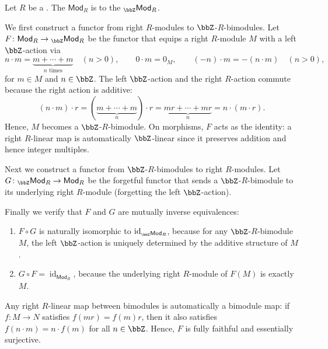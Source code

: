 \begin{proposition} \label{proposition:category_of_right_R_modules_is_equivalent_to_Z_R_bimodules}
    Let $R$ be a . The  $\mathsf{Mod}_R$ is  to the  ${}_\bbZ\mathsf{Mod}_R$.

    We first construct a functor from right $R$-modules to $\bbZ$-$R$-bimodules. Let $F \colon \mathsf{Mod}_R \to {}_\bbZ\mathsf{Mod}_R$ be the functor that equips a right $R$-module $M$ with a left $\bbZ$-action via
    $$n \cdot m = \underbrace{m + \cdots + m}_{n \text{ times}} \quad (n > 0), \qquad 0 \cdot m = 0_M, \qquad (-n) \cdot m = -(n \cdot m) \quad (n > 0),$$
    for $m \in M$ and $n \in \bbZ$. The left $\bbZ$-action and the right $R$-action commute because the right action is additive:
    $$(n \cdot m) \cdot r = (\underbrace{m + \cdots + m}_{n}) \cdot r = \underbrace{mr + \cdots + mr}_{n} = n \cdot (m \cdot r).$$
    Hence, $M$ becomes a $\bbZ$-$R$-bimodule. On morphisms, $F$ acts as the identity: a right $R$-linear map is automatically $\bbZ$-linear since it preserves addition and hence integer multiples.

    Next we construct a functor from $\bbZ$-$R$-bimodules to right $R$-modules. Let $G \colon {}_\bbZ\mathsf{Mod}_R \to \mathsf{Mod}_R$ be the forgetful functor that sends a $\bbZ$-$R$-bimodule to its underlying right $R$-module (forgetting the left $\bbZ$-action).

    Finally we verify that $F$ and $G$ are mutually inverse equivalences:
    \begin{enumerate}
        \item $F \circ G$ is naturally isomorphic to $\operatorname{id}_{{}_\bbZ\mathsf{Mod}_R}$, because for any $\bbZ$-$R$-bimodule $M$, the left $\bbZ$-action is uniquely determined by the additive structure of $M$.
        \item $G \circ F = \operatorname{id}_{\mathsf{Mod}_R}$, because the underlying right $R$-module of $F(M)$ is exactly $M$.
    \end{enumerate}
    Any right $R$-linear map between bimodules is automatically a bimodule map: if $f \colon M \to N$ satisfies $f(mr) = f(m)r$, then it also satisfies $f(n \cdot m) = n \cdot f(m)$ for all $n \in \bbZ$. Hence, $F$ is fully faithful and essentially surjective.
\end{proposition}
